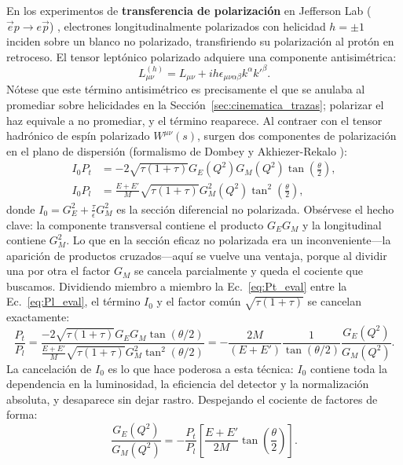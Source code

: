 \documentclass[10pt,a4paper]{article}
\begin{document}
En los experimentos de \textbf{transferencia de polarización} en Jefferson Lab ($\vec{e} p \to e \vec{p}$) \cite{jones2000,punjabi2005}, electrones longitudinalmente polarizados con helicidad $h = \pm 1$ inciden sobre un blanco no polarizado, transfiriendo su polarización al protón en retroceso. El tensor leptónico polarizado adquiere una componente antisimétrica:
\begin{equation}
L_{\mu\nu}^{(h)} = L_{\mu\nu} + i h \epsilon_{\mu\nu\alpha\beta} k^\alpha k'^\beta.
\end{equation}
Nótese que este término antisimétrico es precisamente el que se anulaba al promediar sobre helicidades en la Sección~\ref{sec:cinematica_trazas}; polarizar el haz equivale a no promediar, y el término reaparece. Al contraer con el tensor hadrónico de espín polarizado $W^{\mu\nu}(s)$, surgen dos componentes de polarización en el plano de dispersión (formalismo de Dombey y Akhiezer-Rekalo \cite{perdrisat2007}):
\begin{align}
I_0 P_t &= - 2 \sqrt{\tau(1+\tau)} G_E(Q^2) G_M(Q^2) \tan\left(\frac{\theta}{2}\right), \label{eq:Pt_eval} \\
I_0 P_l &= \frac{E + E'}{M} \sqrt{\tau(1+\tau)} G_M^2(Q^2) \tan^2\left(\frac{\theta}{2}\right), \label{eq:Pl_eval}
\end{align}
donde $I_0 = G_E^2 + \frac{\tau}{\epsilon} G_M^2$ es la sección diferencial no polarizada. Obsérvese el hecho clave: la componente transversal contiene el producto $G_EG_M$ y la longitudinal contiene $G_M^2$. Lo que en la sección eficaz no polarizada era un inconveniente---la aparición de productos cruzados---aquí se vuelve una ventaja, porque al dividir una por otra el factor $G_M$ se cancela parcialmente y queda el cociente que buscamos. Dividiendo miembro a miembro la Ec.~\eqref{eq:Pt_eval} entre la Ec.~\eqref{eq:Pl_eval}, el término $I_0$ y el factor común $\sqrt{\tau(1+\tau)}$ se cancelan exactamente:
\begin{equation}
\frac{P_t}{P_l} = \frac{- 2 \sqrt{\tau(1+\tau)} G_E G_M \tan(\theta/2)}{\frac{E + E'}{M} \sqrt{\tau(1+\tau)} G_M^2 \tan^2(\theta/2)} = - \frac{2 M}{(E + E')} \frac{1}{\tan(\theta/2)} \frac{G_E(Q^2)}{G_M(Q^2)}.
\label{eq:Pt_Pl_ratio_intermediate}
\end{equation}
La cancelación de $I_0$ es lo que hace poderosa a esta técnica: $I_0$ contiene toda la dependencia en la luminosidad, la eficiencia del detector y la normalización absoluta, y desaparece sin dejar rastro. Despejando el cociente de factores de forma:
\begin{equation}
\frac{G_E(Q^2)}{G_M(Q^2)} = - \frac{P_t}{P_l} \left[ \frac{E + E'}{2M} \tan\left(\frac{\theta}{2}\right) \right].
\label{eq:GE_GM_recoil_kin}
\end{equation}
\end{document}
